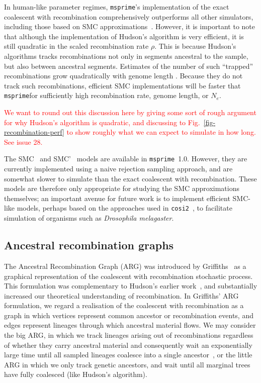 \documentclass{article}
\newcommand{\msprime}[0]{\texttt{msprime}}
\newcommand{\jkcomment}[1]{\textcolor{red}{#1}}
\begin{document}
In human-like parameter regimes, \msprime's implementation of the
exact coalescent with recombination comprehensively outperforms
all other simulators, including those based on SMC
approximations~\citep{kelleher2016efficient}. However, it is important
to note that although the implementation of Hudson's algorithm is
very efficient, it is still quadratic in the scaled recombination rate
$\rho$. This is because Hudson's algorithms tracks recombinations not only
in segments ancestral to the sample, but also between ancestral segments.
Estimates of the number of such ``trapped'' recombinations grow quadratically
with genome length \citep[Eq.~5.10]{hein2004gene}.
Because they do not track such recombinations, efficient SMC implementations
will be faster that \msprime for sufficiently high recombination rate,
genome length, or $N_e$. %


\jkcomment{We want to round out this discussion here by giving some
sort of rough argument for why Hudson's algorithm is quadratic, and discussing
to Fig.~\ref{fig-recombination-perf} to show roughly what we can expect
to simulate in how long. See issue 28.}

The SMC~\citep{mcvean2005approximating} and
SMC'~\citep{marjoram2006fast} models are available
in \msprime\ 1.0. However, they are currently implemented using a
naive rejection sampling approach, and are somewhat slower
to simulate than the exact coalescent with recombination. These
models are therefore only appropriate for studying the SMC approximations
themselves; an important avenue for future work is to implement
efficient SMC-like models, perhaps based on the approaches used
in \texttt{cosi2}~\citep{shlyakhter2014cosi2}, to facilitate
simulation of organisms such as \textit{Drosophila melagaster}.


\subsection*{Ancestral recombination graphs}

The Ancestral Recombination Graph (ARG) was introduced by
Griffiths~\citep{griffiths1991two,griffiths1997ancestral} as a graphical
representation of the coalescent with recombination stochastic process. This
formulation was complementary to Hudson's earlier
work~\citep{hudson1983properties}, and substantially increased our theoretical
understanding of recombination. In Griffiths' ARG formulation, we
regard a realisation of the coalescent with recombination as a graph in which
vertices represent common ancestor or recombination events, and edges represent
lineages through which ancestral material flows.
We may consider the big ARG, in which we track lineages arising out of
recombinations regardless of whether they carry ancestral material and
consequently wait an exponentially large time until all sampled lineages
coalesce into a single ancestor~\citep{ethier1990two}, or the little ARG in
which we only track genetic ancestors, and wait until all marginal trees
have fully coalesced (like Hudson's algorithm).
\end{document}

